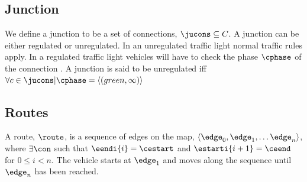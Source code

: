 \subsection{Junction}
We define a junction \ju to be a set of connections, $\jucons \subseteq C$. 
A junction can be either regulated or unregulated. 
In an unregulated traffic light normal traffic rules apply. 
In a regulated traffic light vehicles will have to check the phase $\cphase$ of the connection \vehpos. 
A junction is said to be unregulated iff $\forall c \in \jucons | \cphase = \langle(green, \infty)\rangle$

\subsection{Routes}
A route, $\route$, is a sequence of edges on the map, $\langle \edge_0, \edge_1, \dots \edge_n \rangle$, where $\exists \con$ such that $\eendi{i} = \cestart$ and $\estarti{i+1} = \ceend$ for $0\leq i< n$.
The vehicle starts at $\edge_1$ and moves along the sequence until $\edge_n$ has been reached.